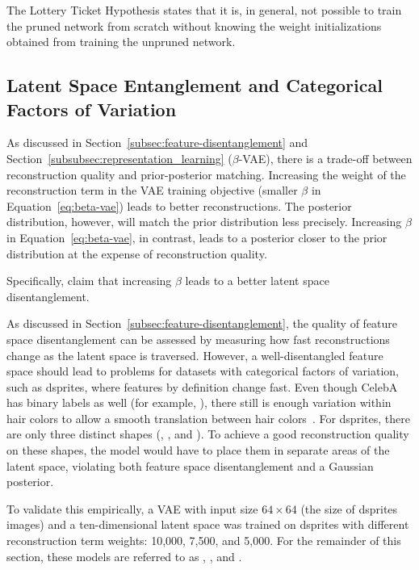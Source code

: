 The Lottery Ticket Hypothesis states that it is, in general, not possible to train the pruned network from scratch without knowing the weight initializations obtained from training the unpruned network.

\subsection{Latent Space Entanglement and Categorical Factors of Variation}\label{subsec:latent-space-entanglement-and-categorical-factors-of-variation}

As discussed in Section~\ref{subsec:feature-disentanglement} and Section~\ref{subsubsec:representation_learning} ($\beta$-\ac{VAE}), there is a trade-off between reconstruction quality and prior-posterior matching.
Increasing the weight of the reconstruction term in the \ac{VAE} training objective (smaller $\beta$ in Equation~\ref{eq:beta-vae}) leads to better reconstructions.
The posterior distribution, however, will match the prior distribution less precisely.
Increasing $\beta$ in Equation~\ref{eq:beta-vae}, in contrast, leads to a posterior closer to the prior distribution at the expense of reconstruction quality.

Specifically, \citet{higgins2017beta} claim that increasing $\beta$ leads to a better latent space disentanglement.

As discussed in Section~\ref{subsec:feature-disentanglement}, the quality of feature space disentanglement can be assessed by measuring how fast reconstructions change as the latent space is traversed.
However, a well-disentangled feature space should lead to problems for datasets with categorical factors of variation, such as dsprites, where features by definition change fast.
Even though CelebA has binary labels as well (for example, ), there still is enough variation within hair colors to allow a smooth translation between hair colors~\citep{higgins2017beta}.
For dsprites, there are only three distinct shapes (, , and ).
To achieve a good reconstruction quality on these shapes, the model would have to place them in separate areas of the latent space, violating both feature space disentanglement and a Gaussian posterior.

To validate this empirically, a \ac{VAE} with input size $64\times 64$ (the size of dsprites images) and a ten-dimensional latent space was trained on dsprites with different reconstruction term weights: 10,000, 7,500, and 5,000.
For the remainder of this section, these models are referred to as , , and .

